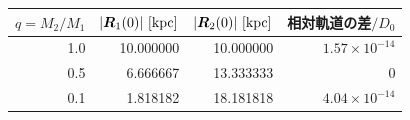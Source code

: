 \begin{tabular}{rrrr}\toprule
$q=M_2/M_1$ & $|\Rvec_1(0)|\ [\mathrm{kpc}]$ & $|\Rvec_2(0)|\ [\mathrm{kpc}]$ & 相対軌道の差$/D_0$ \\
\midrule
1.0 & 10.000000 & 10.000000 & $1.57\times 10^{-14}$ \\
0.5 & 6.666667 & 13.333333 & $0$ \\
0.1 & 1.818182 & 18.181818 & $4.04\times 10^{-14}$ \\
\bottomrule\end{tabular}
